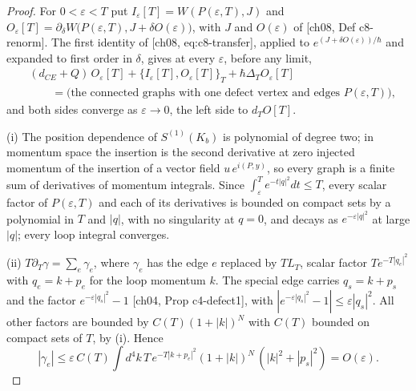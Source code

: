 \begin{proof}
For $0<\varepsilon<T$ put $I_\varepsilon[T]=W(P(\varepsilon,T),J)$ and $O_\varepsilon[T]=\partial_\delta W\big(P(\varepsilon,T),J+\delta O(\varepsilon)\big)$, with $J$ and $O(\varepsilon)$ of [ch08, Def c8-renorm]. The first identity of [ch08, eq:c8-transfer], applied to $e^{(J+\delta O(\varepsilon))/\hbar}$ and expanded to first order in $\delta$, gives at every $\varepsilon$, before any limit,
\begin{equation}
\begin{aligned}
&(d_{CE}+Q)\,O_\varepsilon[T]+\big\{I_\varepsilon[T],O_\varepsilon[T]\big\}_T+\hbar\Delta_TO_\varepsilon[T]\\
&\qquad=\big(\text{the connected graphs with one defect vertex and edges }P(\varepsilon,T)\big),
\end{aligned}
\label{eq:ktr-exact}
\end{equation}
and both sides converge as $\varepsilon\to0$, the left side to $d_TO[T]$.

(i) The position dependence of $S^{(1)}(K_b)$ is polynomial of degree two; in momentum space the insertion is the second derivative at zero injected momentum of the insertion of a vector field $u\,e^{i(P,y)}$, so every graph is a finite sum of derivatives of momentum integrals. Since $\int_\varepsilon^Te^{-t|q|^2}dt\le T$, every scalar factor of $P(\varepsilon,T)$ and each of its derivatives is bounded on compact sets by a polynomial in $T$ and $|q|$, with no singularity at $q=0$, and decays as $e^{-\varepsilon|q|^2}$ at large $|q|$; every loop integral converges.

(ii) $T\partial_T\gamma=\sum_e\gamma_e$, where $\gamma_e$ has the edge $e$ replaced by $TL_T$, scalar factor $Te^{-T|q_e|^2}$ with $q_e=k+p_e$ for the loop momentum $k$. The special edge carries $q_s=k+p_s$ and the factor $e^{-\varepsilon|q_s|^2}-1$ [ch04, Prop c4-defect1], with $|e^{-\varepsilon|q_s|^2}-1|\le\varepsilon|q_s|^2$. All other factors are bounded by $C(T)(1+|k|)^N$ with $C(T)$ bounded on compact sets of $T$, by (i). Hence
\[
|\gamma_e|\le\varepsilon\,C(T)\int d^4k\,T\,e^{-T|k+p_e|^2}(1+|k|)^{N}\,(|k|^2+|p_s|^2)=O(\varepsilon).
\]


\end{proof}
